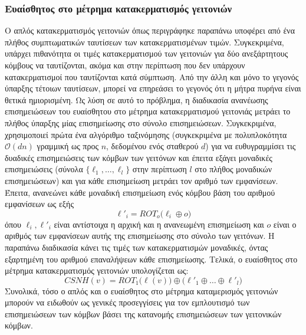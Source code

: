 \subsubsection{Ευαίσθητος στο μέτρημα κατακερματισμός γειτονιών}
Ο απλός κατακερματισμός γειτονιών όπως περιγράφηκε παραπάνω υποφέρει από ένα πλήθος συμπτωματικών ταυτίσεων των κατακερματισμένων τιμών.
Συγκεκριμένα, υπάρχει πιθανότητα οι τιμές κατακερματισμού των γειτονιών για δύο ανεξάρτητους κόμβους να ταυτίζονται, ακόμα και στην περίπτωση που δεν υπάρχουν κατακερματισμοί που ταυτίζονται κατά σύμπτωση. Από την άλλη και μόνο το γεγονός ύπαρξης τέτοιων ταυτίσεων, μπορεί να επηρεάσει το γεγονός ότι η μήτρα πυρήνα είναι θετικά ημιορισμένη.
Ως λύση σε αυτό το πρόβλημα, η διαδικασία ανανέωσης επισημειώσεων του ευαίσθητου στο μέτρημα κατακερματισμού γειτονιάς μετράει το πλήθος ύπαρξης μίας επισημείωσης στο σύνολο επισημειώσεων.
Συγκεκριμένα, χρησιμοποιεί πρώτα ένα αλγόριθμο ταξινόμησης (συγκεκριμένα  με πολυπλοκότητα $\mathcal{O}(d n)$ γραμμική ως προς $n$, δεδομένου ενός σταθερού $d$) για να ευθυγραμμίσει τις δυαδικές επισημειώσεις των κόμβων των γειτόνων και έπειτα εξάγει μοναδικές επισημειώσεις (σύνολα $\{ \ell_1, \ldots, \ell_l \}$ στην περίπτωση $l$ στο πλήθος μοναδικών επισημειώσεων) και για κάθε επισημείωση μετράει τον αριθμό των εμφανίσεων.
Έπειτα, ανανεώνει κάθε μοναδική επισημείωση ενός κόμβου βάση του αριθμού εμφανίσεων ως εξής
\begin{equation}
    \ell'_i = ROT_o \big( \ell_i \oplus o \big)
\end{equation}
όπου $\ell_i, \ell'_i$ είναι αντίστοιχα η αρχική και η ανανεωμένη επισημείωση και $o$ είναι ο αριθμός των εμφανίσεων αυτής της επισημείωσης στο σύνολο των γειτόνων.
Η παραπάνω διαδικασία κάνει τις τιμές των κατακερματισμών μοναδικές, όντας εξαρτημένη του αριθμού επαναλήψεων κάθε επισημείωσης.
Τελικά, ο ευαίσθητος στο μέτρημα κατακερματισμός γειτονιών υπολογίζεται ως:
\begin{equation}
    CSNH(v) = ROT_1 \big( \ell(v) \big) \oplus \big( \ell'_1 \oplus \ldots \oplus \ell'_l \big)
\end{equation}
Συνολικά, τόσο ο απλός και ο ευαίσθητος στο μέτρημα καταμερισμός γειτονιών μπορούν να ειδωθούν ως γενικές προσεγγίσεις για τον εμπλουτισμό των επισημειώσεων των κόμβων βάσει της κατανομής επισημειώσεων των γειτονικών κόμβων.

